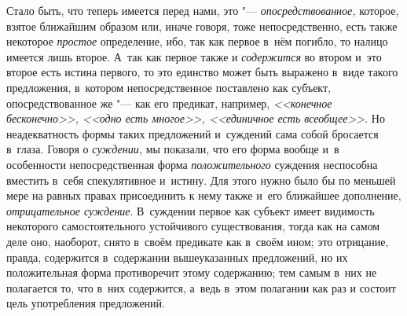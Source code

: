 Стало быть, что теперь имеется перед нами, это "--- {\em опосредствованное,}
которое, взятое ближайшим образом или, иначе говоря, тоже
непосредственно, есть также некоторое {\em простое}
определение, ибо, так как первое в~нём погибло, то налицо
имеется лишь второе. А~так как первое также и {\em содержится} во
втором и~это второе есть истина первого, то это единство может быть
выражено в~виде такого предложения, в~котором
непосредственное поставлено как субъект, опосредствованное же
"--- как его предикат, например, {\em <<конечное бесконечно>>,
<<одно есть многое>>, <<единичное есть всеобщее>>}.
Но неадекватность формы таких предложений и~суждений сама
собой бросается в~глаза. Говоря о {\em суждении,} мы
показали, что его форма вообще и~в особенности непосредственная форма
{\em положительного}
суждения неспособна вместить в~себя спекулятивное и~истину.
Для этого нужно было бы по меньшей мере на равных правах присоединить к
нему также и~его ближайшее дополнение,
{\em отрицательное суждение}.
В~суждении первое как субъект имеет видимость некоторого
самостоятельного устойчивого существования, тогда как на самом деле оно,
наоборот, снято в~своём предикате как в~своём ином; это отрицание,
правда, содержится в~содержании вышеуказанных предложений, но их
положительная форма противоречит этому содержанию; тем самым в~них не
полагается то, что в~них содержится, а~ведь в~этом полагании как раз и
состоит цель употребления предложений.

